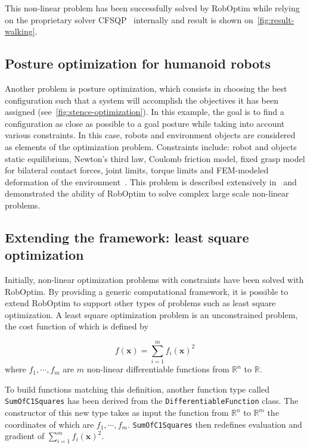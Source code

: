\documentclass[conference,final,a4paper,twocolumn,9pt]{IEEEtran}
\begin{document}
This non-linear problem has been successfully solved by RobOptim while
relying on the proprietary solver CFSQP~\cite{cfsqp} internally and
result is shown on~\autoref{fig:result-walking}.


\subsection{Posture optimization for humanoid robots}


Another problem is posture optimization, which consists in choosing
the best configuration such that a system will accomplish the
objectives it has been assigned
(see~\ref{fig:stence-optimization}). In this example, the goal is to
find a configuration as close as possible to a goal posture while
taking into account various constraints. In this case, robots and
environment objects are considered as elements of the optimization
problem. Constraints include: robot and objects static equilibrium,
Newton's third law, Coulomb friction model, fixed grasp model for
bilateral contact forces, joint limits, torque limits and FEM-modeled
deformation of the environment~\cite{Bouyarmane2011b}. This problem is
described extensively in~\cite{Bouyarmane2011a,Bouyarmane2010} and
demonstrated the ability of RobOptim to solve complex large scale
non-linear problems.


\subsection{Extending the framework: least square optimization}


Initially, non-linear optimization problems with constraints have been
solved with RobOptim. By providing a generic computational framework,
it is possible to extend RobOptim to support other types of problems
such as least square optimization. A least square optimization problem
is an unconstrained problem, the cost function of which is defined by

\begin{equation}
  f(\mathbf{x}) = \sum_{i=1}^m f_i (\mathbf{x})^2
\end{equation}
where $f_1,\cdots,f_m$ are $m$ non-linear differentiable functions from $\mathbb{R}^n$ to $\mathbb{R}$.

To build functions matching this definition, another function type
called \texttt{SumOfC1Squares} has been derived from the
\texttt{DifferentiableFunction} class. The constructor of this new type takes
as input the function from $\mathbb{R}^n$ to $\mathbb{R}^m$ the coordinates of
which are $f_1,\cdots,f_m$. \texttt{SumOfC1Squares} then redefines evaluation
and gradient of $\sum_{i=1}^m f_i (\mathbf{x})^2$.
\end{document}
